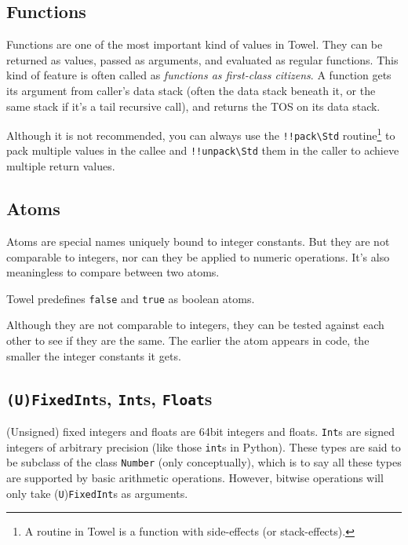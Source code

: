 \documentclass{report}
\newcommand{\mstd}[1]{\texttt{#1\textbackslash Std}}
\begin{document}
\subsection{Functions}

Functions are one of the most important kind of values in Towel. They can be returned as values, passed as arguments, and evaluated as regular functions. This kind of feature is often called as \textit{functions as first-class citizens}. A function gets its argument from caller's data stack (often the data stack beneath it, or the same stack if it's a tail recursive call), and returns the TOS on its data stack.

\begin{mdframed}[style=hint]
Although it is not recommended, you can always use the \mstd{!!pack} routine\footnote{A routine in Towel is a function with side-effects (or stack-effects).} to pack multiple values in the callee and \mstd{!!unpack} them in the caller to achieve multiple return values.
\end{mdframed}

\subsection{Atoms}

Atoms are special names uniquely bound to integer constants. But they are not comparable to integers, nor can they be applied to numeric operations. It's also meaningless to compare between two atoms.

Towel predefines \texttt{false} and \texttt{true} as boolean atoms.

\begin{mdframed}[style=detail]
Although they are not comparable to integers, they can be tested against each other to see if they are the same. The earlier the atom appears in code, the smaller the integer constants it gets.
\end{mdframed}

\subsection{\texttt{(U)FixedInt}s, \texttt{Int}s, \texttt{Float}s}

(Unsigned) fixed integers and floats are 64bit integers and floats. \texttt{Int}s are signed integers of arbitrary precision (like those \texttt{int}s in Python). These types are said to be subclass of the class \texttt{Number} (only conceptually), which is to say all these types are supported by basic arithmetic operations. However, bitwise operations will only take (\texttt{U})\texttt{FixedInt}s as arguments.
\end{document}
